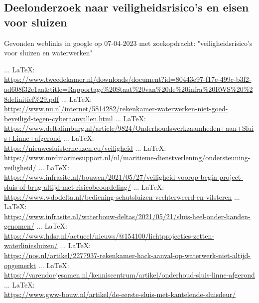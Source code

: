 \begin{thebibliography}{99}
\chapter{Deelonderzoek naar veiligheidsrisico's en eisen voor sluizen}

Gevonden weblinks in google op 07-04-2023 met zoekopdracht: "veiligheidsrisico's voor sluizen en waterwerken"






 ... \LaTeX:\\ \url{https://www.tweedekamer.nl/downloads/document?id=80443e97-f17e-499c-b3f2-ad608f32e1aa&title=Rapportage%20Staat%20van%20de%20infra%20RWS%20%28definitief%29.pdf}
 ... \LaTeX:\\ \url{https://www.nu.nl/internet/5814282/rekenkamer-waterwerken-niet-goed-beveiligd-tegen-cyberaanvallen.html}
 ... \LaTeX:\\ \url{https://www.deltalimburg.nl/article/9824/Onderhoudswerkzaamheden+aan+Sluis+Linne+afgerond}
 ... \LaTeX:\\ \url{https://nieuwesluisterneuzen.eu/veiligheid}
 ... \LaTeX:\\ \url{https://www.mrdmarinesupport.nl/nl/maritieme-dienstverlening/ondersteuning-veiligheid/}
 ... \LaTeX:\\ \url{https://www.infrasite.nl/bouwen/2021/05/27/veiligheid-voorop-begin-project-sluis-of-brug-altijd-met-risicobeoordeling/}
 ... \LaTeX:\\ \url{https://www.wdodelta.nl/bediening-schutsluizen-vechterweerd-en-vilsteren}
 ... \LaTeX:\\ \url{https://www.infrasite.nl/waterbouw-deltas/2021/05/21/sluis-heel-onder-handen-genomen/}
 ... \LaTeX:\\ \url{https://www.hdsr.nl/actueel/nieuws/@154100/lichtprojecties-zetten-waterliniesluizen/}
 ... \LaTeX:\\ \url{https://nos.nl/artikel/2277937-rekenkamer-hack-aanval-op-waterwerk-niet-altijd-opgemerkt}
 ... \LaTeX:\\ \url{https://varendoejesamen.nl/kenniscentrum/artikel/onderhoud-sluis-linne-afgerond}
 ... \LaTeX:\\ \url{https://www.gww-bouw.nl/artikel/de-eerste-sluis-met-kantelende-sluisdeur/}

\end{thebibliography}

